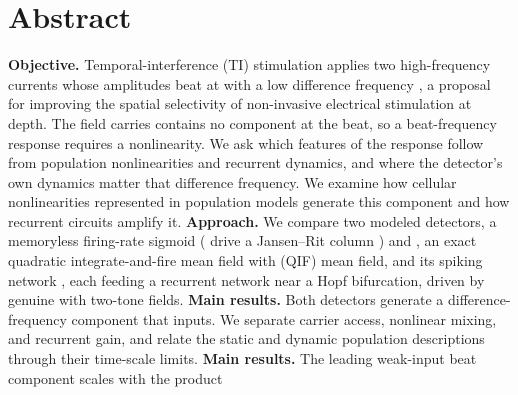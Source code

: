 \documentclass[11pt,a4paper]{article}
\newif\ifjne
\newif\ifsupp
\providecommand{\DIFaddtex}[1]{{\protect\color{blue} \sf #1}} %
\providecommand{\DIFdeltex}[1]{{\protect\color{red} \scriptsize #1}} %
\providecommand{\DIFaddbegin}{} %
\providecommand{\DIFaddend}{} %
\providecommand{\DIFdelbegin}{} %
\providecommand{\DIFdelend}{} %
\providecommand{\DIFadd}[1]{\texorpdfstring{\DIFaddtex{#1}}{#1}} %
\providecommand{\DIFdel}[1]{\texorpdfstring{\DIFdeltex{#1}}{}} %
\begin{document}
\ifsupp\else
\section*{Abstract}
\ifjne
\noindent
\textbf{Objective.} Temporal-interference (TI) stimulation applies two high-frequency
currents \DIFdelbegin \DIFdel{whose amplitudes beat at }\DIFdelend \DIFaddbegin \DIFadd{with }\DIFaddend a low difference frequency\DIFdelbegin \DIFdel{, a proposal for improving the
spatial selectivity of non-invasive electrical stimulation at depth}\DIFdelend . The field \DIFdelbegin \DIFdel{carries }\DIFdelend \DIFaddbegin \DIFadd{contains }\DIFaddend no component at \DIFdelbegin \DIFdel{the beat, so a beat-frequency response requires a nonlinearity. We ask which
features of the response follow from population nonlinearities and recurrent dynamics, and
where the detector's own dynamics matter}\DIFdelend \DIFaddbegin \DIFadd{that
difference frequency. We examine how cellular nonlinearities represented in population
models generate this component and how recurrent circuits amplify it}\DIFaddend .
\textbf{Approach.} We \DIFdelbegin \DIFdel{compare two modeled detectors, a memoryless firing-rate sigmoid
(}\DIFdelend \DIFaddbegin \DIFadd{drive a }\DIFaddend Jansen--Rit column\DIFdelbegin \DIFdel{) and }\DIFdelend \DIFaddbegin \DIFadd{, }\DIFaddend an exact quadratic integrate-and-fire
\DIFdelbegin \DIFdel{mean field with }\DIFdelend \DIFaddbegin \DIFadd{(QIF) mean field, and }\DIFaddend its spiking network \DIFdelbegin \DIFdel{, each feeding a recurrent network near a Hopf bifurcation, driven by genuine
}\DIFdelend \DIFaddbegin \DIFadd{with }\DIFaddend two-tone \DIFdelbegin \DIFdel{fields.
\textbf{Main results.} Both detectors generate a difference-frequency component that }\DIFdelend \DIFaddbegin \DIFadd{inputs. We separate carrier
access, nonlinear mixing, and recurrent gain, and relate the static and dynamic
population descriptions through their time-scale limits.
\textbf{Main results.} The leading weak-input beat component }\DIFaddend scales with the product
\end{document}
